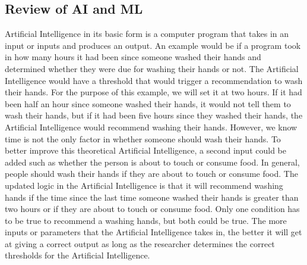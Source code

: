 \documentclass[]{article}
\begin{document}
			
		\subsection{Review of AI and ML}\label{introtoai}
			
			Artificial Intelligence in its basic form is a computer program that takes in an input or inputs and produces an output. An example would be if a program took in how many hours it had been since someone washed their hands and determined whether they were due for washing their hands or not. The Artificial Intelligence would have a threshold that would trigger a recommendation to wash their hands. For the purpose of this example, we will set it at two hours. If it had been half an hour since someone washed their hands, it would not tell them to wash their hands, but if it had been five hours since they washed their hands, the Artificial Intelligence would recommend washing their hands. However, we know time is not the only factor in whether someone should wash their hands. To better improve this theoretical Artificial Intelligence, a second input could be added such as whether the person is about to touch or consume food. In general, people should wash their hands if they are about to touch or consume food. The updated logic in the Artificial Intelligence is that it will recommend washing hands if the time since the last time someone washed their hands is greater than two hours or if they are about to touch or consume food. Only one condition has to be true to recommend a washing hands, but both could be true. The more inputs or parameters that the Artificial Intelligence takes in, the better it will get at giving a correct output as long as the researcher determines the correct thresholds for the Artificial Intelligence.
\end{document}
